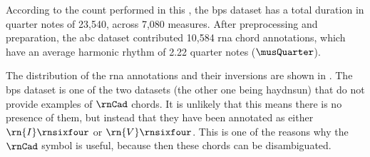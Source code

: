 
According to the count performed in this \thesisdiss{}, the
\gls{bps} dataset has a total duration in quarter notes of
23,540, across 7,080 measures. After preprocessing and
preparation, the \gls{abc} dataset contributed 10,584
\gls{rna} chord annotations, which have an average harmonic
rhythm of 2.22 quarter notes ($\musQuarter$).

The distribution of the \gls{rna} annotations and their
inversions are shown in . The
\gls{bps} dataset is one of the two datasets (the other one
being \gls{haydnsun}) that do not provide examples of
$\rnCad$ chords. It is unlikely that this means there is no
presence of them, but instead that they have been annotated
as either $\rn{I}\rnsixfour$ or $\rn{V}\rnsixfour$. This is
one of the reasons why the $\rnCad$ symbol is useful,
because then these chords can be disambiguated.







